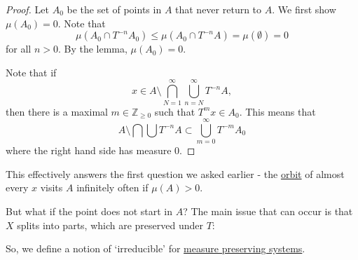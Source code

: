 \documentclass{article}
\begin{document}
\begin{proof}
  Let $A_0$ be the set of points in $A$ that never return to $A$.
  We first show $\mu(A_0) = 0$.
  Note that
  \begin{equation*}\mu(A_0 \cap T^{-n} A_0) \leq \mu(A_0 \cap T^{-n} A) = \mu(\emptyset) = 0\end{equation*}
  for all $n > 0$.
  By the lemma, $\mu(A_0) = 0$.

  Note that if
  \begin{equation*}x \in A \setminus \bigcap_{N=1}^\infty \bigcup_{n=N}^\infty T^{-n} A,\end{equation*}
  then there is a maximal $m \in \mathbb{Z}_{\geq 0}$ such that $T^m x \in A_0$.
  This means that
  \begin{equation*}
    A \setminus \bigcap \bigcup T^{-n} A \subset \bigcup_{m=0}^\infty T^{-m} A_0
  \end{equation*}
  where the right hand side has measure 0.
\end{proof}

This effectively answers the first question we asked earlier - the \hyperlink{def:orbit}{orbit} of almost every $x$ visits $A$ infinitely often if $\mu(A) > 0$.

But what if the point does not start in $A$?
The main issue that can occur is that $X$ splits into parts, which are preserved under $T$:
\begin{center}
\end{center}

So, we define a notion of `irreducible' for \hyperlink{def:mps}{measure preserving systems}.
\end{document}
